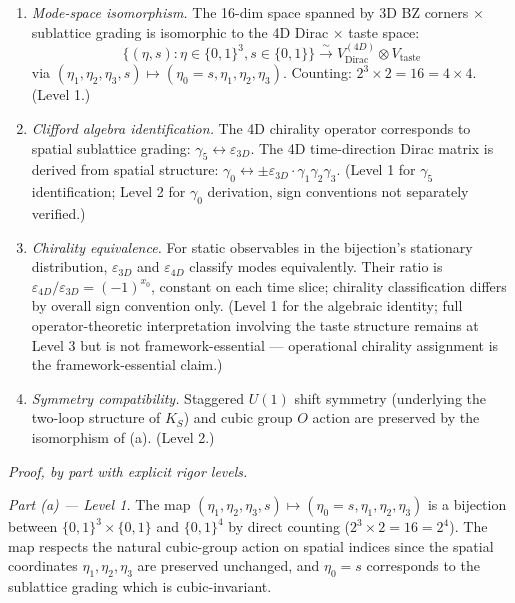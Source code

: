 \documentclass[
]{article}
\begin{document}
\begin{enumerate}
\def\labelenumi{(\alph{enumi})}
\item
  \emph{Mode-space isomorphism.} The 16-dim space spanned by 3D BZ
  corners × sublattice grading is isomorphic to the 4D Dirac × taste
  space:
  \[\{(\eta, s) : \eta \in \{0,1\}^3, s \in \{0,1\}\} \xrightarrow{\sim} V_{\text{Dirac}}^{(4D)} \otimes V_{\text{taste}}\]
  via
  \((\eta_1, \eta_2, \eta_3, s) \mapsto (\eta_0 = s, \eta_1, \eta_2, \eta_3)\).
  Counting: \(2^3 \times 2 = 16 = 4 \times 4\). (Level 1.)
\item
  \emph{Clifford algebra identification.} The 4D chirality operator
  corresponds to spatial sublattice grading:
  \(\gamma_5 \leftrightarrow \varepsilon_{3D}\). The 4D time-direction
  Dirac matrix is derived from spatial structure:
  \(\gamma_0 \leftrightarrow \pm \varepsilon_{3D} \cdot \gamma_1\gamma_2\gamma_3\).
  (Level 1 for \(\gamma_5\) identification; Level 2 for \(\gamma_0\)
  derivation, sign conventions not separately verified.)
\item
  \emph{Chirality equivalence.} For static observables in the
  bijection's stationary distribution, \(\varepsilon_{3D}\) and
  \(\varepsilon_{4D}\) classify modes equivalently. Their ratio is
  \(\varepsilon_{4D}/\varepsilon_{3D} = (-1)^{x_0}\), constant on each
  time slice; chirality classification differs by overall sign
  convention only. (Level 1 for the algebraic identity; full
  operator-theoretic interpretation involving the taste structure
  remains at Level 3 but is not framework-essential --- operational
  chirality assignment is the framework-essential claim.)
\item
  \emph{Symmetry compatibility.} Staggered \(U(1)\) shift symmetry
  (underlying the two-loop structure of \(K_S\)) and cubic group \(O\)
  action are preserved by the isomorphism of (a). (Level 2.)
\end{enumerate}

\emph{Proof, by part with explicit rigor levels.}

\emph{Part (a) --- Level 1.} The map
\((\eta_1, \eta_2, \eta_3, s) \mapsto (\eta_0 = s, \eta_1, \eta_2, \eta_3)\)
is a bijection between \(\{0,1\}^3 \times \{0,1\}\) and \(\{0,1\}^4\) by
direct counting (\(2^3 \times 2 = 16 = 2^4\)). The map respects the
natural cubic-group action on spatial indices since the spatial
coordinates \(\eta_1, \eta_2, \eta_3\) are preserved unchanged, and
\(\eta_0 = s\) corresponds to the sublattice grading which is
cubic-invariant.
\end{document}
